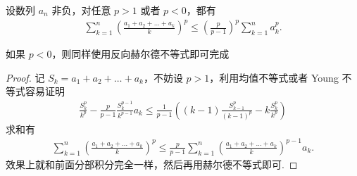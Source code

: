 \documentclass[../../main.tex]{subfiles}
\begin{document}
\begin{corollary}[离散版Hardy不等式]\label{corollary:离散版Hardy(哈代)不等式}
设数列 $a_n$ 非负，对任意 $p > 1$ 或者 $p < 0$，都有
\begin{align*}
\sum_{k=1}^n \left( \frac{a_1 + a_2 + \dots + a_k}{k} \right)^p \leqslant \left( \frac{p}{p - 1} \right)^p \sum_{k=1}^n a_k^p.
\end{align*}
\end{corollary}
\begin{remark}
如果 $p < 0$，则同样使用反向赫尔德不等式即可完成
\end{remark}
\begin{proof}
记 $S_k = a_1 + a_2 + \dots + a_k$，不妨设 $p > 1$，利用均值不等式或者 Young 不等式容易证明
\begin{align*}
\frac{S_k^p}{k^p} - \frac{p}{p - 1} \frac{S_k^{p - 1}}{k^{p - 1}} a_k \leqslant \frac{1}{p - 1} \left( (k - 1) \frac{S_{k - 1}^p}{(k - 1)^p} - k \frac{S_k^p}{k^p} \right)
\end{align*}
求和有
\begin{align*}
\sum_{k=1}^n \left( \frac{a_1 + a_2 + \dots + a_k}{k} \right)^p \leqslant \frac{p}{p - 1} \sum_{k=1}^n \left( \frac{a_1 + a_2 + \dots + a_k}{k} \right)^{p - 1} a_k.
\end{align*}
效果上就和前面分部积分完全一样，然后再用赫尔德不等式即可.

\end{proof}
\end{document}
